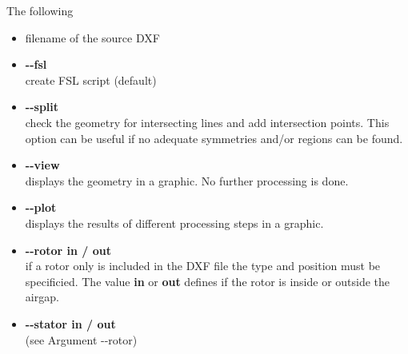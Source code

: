 \documentclass[10pt, a4paper,german]{scrartcl}
\newcommand{\Slanted}[1]{{\normalfont\slshape #1}}
\newcommand{\LongArg}[1]{\mbox{{-}{-}#1}}
\begin{document}
The following
\begin{itemize}
\item filename of the source DXF
\item {\bfseries{\LongArg{fsl}}}\\
      create FSL script (default)

\item {\bfseries{\LongArg{split}}}\\
		check the geometry for intersecting lines and add intersection points.
       This option can be useful if no adequate symmetries and/or regions can be found.

\item {\bfseries{\LongArg{view}}}\\
		displays the geometry in a graphic. No further processing is done.

\item {\bfseries{\LongArg{plot}}}\\
		displays the results of different processing steps in a graphic.



\item {\bfseries{\LongArg{rotor} in / out}}\\
		if a rotor only is included in the DXF file the type and position must be specificied.
		The value  {\bfseries in}
		or {\bfseries out} defines if the rotor is inside or outside the airgap.

\item {\bfseries{\LongArg{stator} in / out}}\\
		(see Argument \LongArg{rotor})



\end{itemize}
\end{document}
